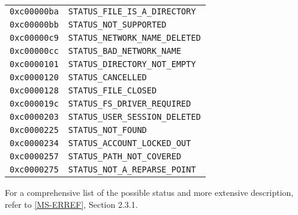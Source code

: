 \documentclass[documentation]{subfiles}
\begin{document}
\begin{longtable}{rl}
    {\tt 0xc00000ba} & {\tt STATUS\_FILE\_IS\_A\_DIRECTORY}\\
    {\tt 0xc00000bb} & {\tt STATUS\_NOT\_SUPPORTED}\\
    {\tt 0xc00000c9} & {\tt STATUS\_NETWORK\_NAME\_DELETED}\\
    {\tt 0xc00000cc} & {\tt STATUS\_BAD\_NETWORK\_NAME}\\
    {\tt 0xc0000101} & {\tt STATUS\_DIRECTORY\_NOT\_EMPTY}\\
    {\tt 0xc0000120} & {\tt STATUS\_CANCELLED}\\
    {\tt 0xc0000128} & {\tt STATUS\_FILE\_CLOSED}\\
    {\tt 0xc000019c} & {\tt STATUS\_FS\_DRIVER\_REQUIRED}\\
    {\tt 0xc0000203} & {\tt STATUS\_USER\_SESSION\_DELETED}\\
    {\tt 0xc0000225} & {\tt STATUS\_NOT\_FOUND}\\
    {\tt 0xc0000234} & {\tt STATUS\_ACCOUNT\_LOCKED\_OUT}\\
    {\tt 0xc0000257} & {\tt STATUS\_PATH\_NOT\_COVERED}\\
    {\tt 0xc0000275} & {\tt STATUS\_NOT\_A\_REPARSE\_POINT}\\
    \bottomrule
\end{longtable}

For a comprehensive list of the possible status and more extensive description, refer to \href{https://msdn.microsoft.com/en-us/library/cc231196.aspx}{[MS-ERREF]}, Section 2.3.1.
\end{document}
